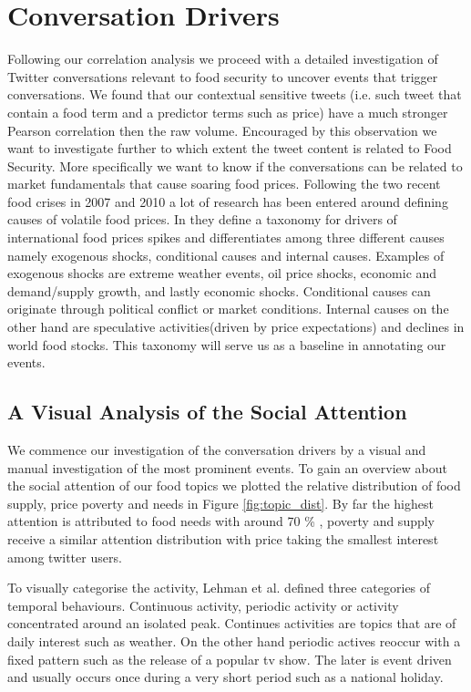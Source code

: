  \section{Conversation Drivers}


Following our correlation analysis we proceed with a detailed investigation of Twitter conversations relevant to food security to uncover events that trigger conversations. We found that our contextual sensitive tweets (i.e. such tweet that contain a food term and a predictor terms such as price) have a much stronger Pearson correlation then the raw volume. Encouraged by this observation we want to investigate further to which extent the tweet content is related to Food Security. More specifically we want to know if the conversations can be related to market fundamentals that cause soaring food prices. Following the two recent food crises in 2007 and 2010 a lot of research has been entered around defining causes of volatile food prices.  In \cite{Tadesse2014} they define a taxonomy for drivers of  international food prices spikes and differentiates among three different causes namely exogenous shocks, conditional causes and internal causes. Examples of exogenous shocks are extreme weather events, oil price shocks, economic and demand/supply growth, and lastly economic shocks. Conditional causes can originate through political conflict or market conditions. Internal causes on the other hand are speculative activities(driven by price expectations) and declines in world food stocks. This taxonomy will serve us as a baseline in annotating our events. 



\subsection{A Visual Analysis of the Social Attention}

We commence our investigation of the conversation drivers by a visual and manual investigation of the most prominent events. To gain an overview about the social attention of our food topics we plotted the relative distribution of food supply, price poverty and needs in Figure \ref{fig:topic_dist}. By far the highest attention is attributed to food needs with around 70 \% , poverty and supply receive a similar attention distribution with price taking the smallest interest among twitter users. 

To visually categorise the activity, Lehman et al. \cite{Lehmann2012} defined three categories of temporal behaviours. Continuous activity, periodic activity or activity concentrated around an isolated peak. Continues activities are topics that are of daily  interest such as weather. On the other hand periodic actives reoccur with a fixed pattern such as the release of a popular tv show. The later is event driven and usually occurs once during a very short period such as a national holiday. 

